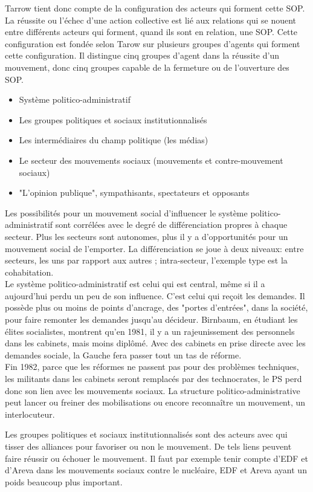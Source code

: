 \documentclass[10pt, a4paper, openany]{book}
\begin{document}
Tarrow tient donc compte de la configuration des acteurs qui forment cette SOP. La réussite ou l'échec d'une action collective est lié aux relations qui se nouent entre différents acteurs qui forment, quand ils sont en relation, une SOP. Cette configuration est fondée selon Tarow sur plusieurs groupes d'agents qui forment cette configuration. Il distingue cinq groupes d'agent dans la réussite d'un mouvement, donc cinq groupes capable de la fermeture ou de l'ouverture des SOP. \\
\begin{itemize}
\item Système politico-administratif
\item Les groupes politiques et sociaux institutionnalisés
\item Les intermédiaires du champ politique (les médias)
\item Le secteur des mouvements sociaux (mouvements et contre-mouvement sociaux)
\item "L'opinion publique", sympathisants, spectateurs et opposants
\end{itemize}
Les possibilités pour un mouvement social d'influencer le système politico-administratif sont corrélées avec le degré de différenciation propres à chaque secteur. Plus les secteurs sont autonomes, plus il y a d'opportunités pour un mouvement social de l'emporter. La différenciation se joue à deux niveaux: entre secteurs, les uns par rapport aux autres ; intra-secteur, l'exemple type est la cohabitation. \\
Le système politico-administratif est celui qui est central, même si il a aujourd'hui perdu un peu de son influence. C'est celui qui reçoit les demandes. Il possède plus ou moins de points d'ancrage, des "portes d'entrées", dans la société, pour faire remonter les demandes jusqu'au décideur. Birnbaum, en étudiant les élites socialistes, montrent qu'en 1981, il y a un rajeunissement des personnels dans les cabinets, mais moins diplômé. Avec des cabinets en prise directe avec les demandes sociale, la Gauche fera passer tout un tas de réforme. \\
Fin 1982, parce que les réformes ne passent pas pour des problèmes techniques, les militants dans les cabinets seront remplacés par des technocrates, le PS perd donc son lien avec les mouvements sociaux. La structure politico-administrative peut lancer ou freiner des mobilisations ou encore reconnaître un mouvement, un interlocuteur.


Les groupes politiques et sociaux institutionnalisés sont des acteurs avec qui tisser des alliances pour favoriser ou non le mouvement. De tels liens peuvent faire réussir ou échouer le mouvement. Il faut par exemple tenir compte d'EDF et d'Areva dans les mouvements sociaux contre le nucléaire, EDF et Areva ayant un poids beaucoup plus important. 
\end{document}
